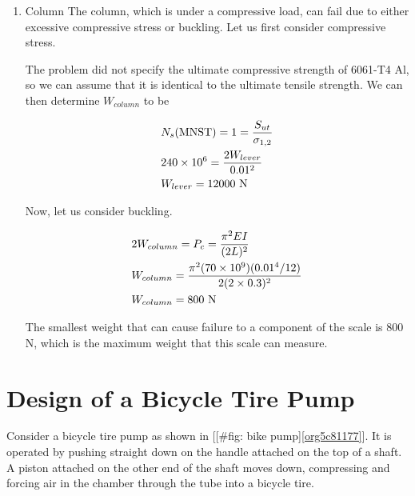 \documentclass[a4paper,openany,12pt]{book}
\begin{document}
{{\begin{enumerate}
\begin{enumerate}
\item Column
\label{sec:org1083455}
The column, which is under a compressive load, can fail due to either
excessive compressive stress or buckling. Let us first consider
compressive stress.

The problem did not specify the ultimate compressive strength of 6061-T4
Al, so we can assume that it is identical to the ultimate tensile
strength. We can then determine \(W_{column}\) to be

$$\begin{gathered}
  N_s\text{(MNST)} = 1 = \frac{S_{ut}}{\sigma_{1,2}} \hfill \\
  240 \times 10^6 = \frac{2W_{lever}}{0.01^2} \hfill \\
  W_{lever} = 12000\text{ N} \hfill \\ 
\end{gathered}$$

Now, let us consider buckling.

$$\begin{gathered}
  2W_{column} = P_c = \frac{\pi ^2EI}{(2L)^2} \hfill \\
  W_{column} = \frac{\pi ^2(70 \times 10^9)(0.01^4/12)}{2(2 \times 0.3)^2} \hfill \\
  W_{column} = 800\text{ N} \hfill \\ 
\end{gathered}$$

The smallest weight that can cause failure to a component of the scale
is 800 N, which is the maximum weight that this scale can measure.
\end{enumerate}
\end{enumerate}

\section{Design of a Bicycle Tire Pump}
\label{sec:org03a3434}
    Consider a bicycle tire pump as shown in
[[\#fig: bike pump]\ref{org5c81177}]. It is operated by pushing
straight down on the handle attached on the top of a shaft. A piston
attached on the other end of the shaft moves down, compressing and
forcing air in the chamber through the tube into a bicycle tire.

}}
\end{document}
